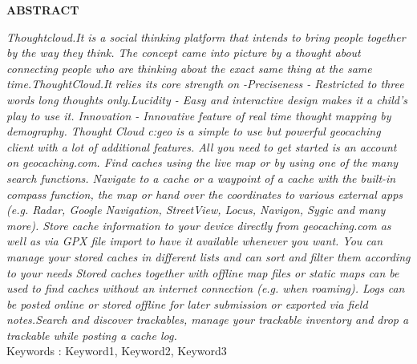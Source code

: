 
\begin{center}
\thispagestyle{empty}
\vspace*{4\baselineskip}
\LARGE{\textbf{ABSTRACT}}\\[1.0cm]
\end{center}
\thispagestyle{empty}
\large{\emph{Thoughtcloud.It  is a social thinking platform that intends to bring people together by the way they think. The concept came into picture by a thought about connecting people who are thinking about the exact same thing at the same time.ThoughtCloud.It relies its core strength on -Preciseness - Restricted to three words long thoughts only.Lucidity - Easy and interactive design makes it a child's play to use it. Innovation - Innovative feature of real time thought mapping by demography. Thought Cloud c:geo is a simple to use but powerful geocaching client with a lot of additional features. All you need to get started is an account on geocaching.com. Find caches using the live map or by using one of the many search functions. Navigate to a cache or a waypoint of a cache with the built-in compass function, the map or hand over the coordinates to various external apps (e.g. Radar, Google Navigation, StreetView, Locus, Navigon, Sygic and many more).
Store cache information to your device directly from geocaching.com as well as via GPX file import to have it available whenever you want. You can manage your stored caches in different lists and can sort and filter them according to your needs Stored caches together with offline map files or static maps can be used to find caches without an internet connection (e.g. when roaming).
Logs can be posted online or stored offline for later submission or exported via field notes.Search and discover trackables, manage your trackable inventory and drop a trackable while posting a cache log.\\[1cm]}}
Keywords : Keyword1, Keyword2, Keyword3
